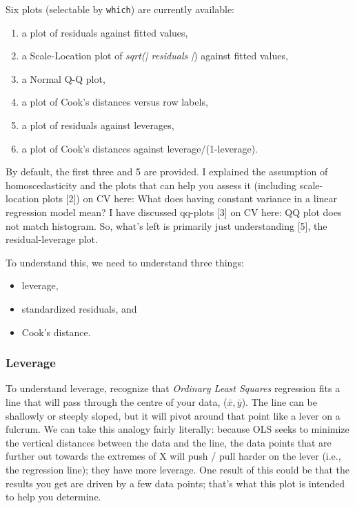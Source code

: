 \documentclass[12pt, a4paper]{article}
\theoremstyle{plain}
\theoremstyle{definition}
\theoremstyle{remark}
\begin{document}
Six plots (selectable by \texttt{which}) are currently available: 
\begin{enumerate}
\item a plot of residuals against fitted values, 
\item a Scale-Location plot of \textit{sqrt(| residuals |}) against fitted values, 
\item a Normal Q-Q plot, 
\item a plot of Cook's distances versus row labels, 
\item a plot of residuals against leverages, 
\item a plot of Cook's distances against leverage/(1-leverage).
\end{enumerate} By default, the first three and 5 are provided.
\newpage
 I explained the assumption of homoscedasticity and the plots that can help you assess it (including scale-location plots [2]) on CV here: What does having constant variance in a linear regression model mean? I have discussed qq-plots [3] on CV here: QQ plot does not match histogram. So, what's left is primarily just understanding [5], the residual-leverage plot.

To understand this, we need to understand three things:

\begin{itemize}
\item leverage,
\item standardized residuals, and
\item Cook's distance.
\end{itemize}
\subsubsection{Leverage}
To understand leverage, recognize that \textit{Ordinary Least Squares} regression fits a line that will pass through the centre of your data, ($\bar{x}, \bar{y}$). The line can be shallowly or steeply sloped, but it will pivot around that point like a lever on a fulcrum. We can take this analogy fairly literally: because OLS seeks to minimize the vertical distances between the data and the line, the data points that are further out towards the extremes of X will push / pull harder on the lever (i.e., the regression line); they have more leverage. One result of this could be that the results you get are driven by a few data points; that's what this plot is intended to help you determine.
\end{document}
